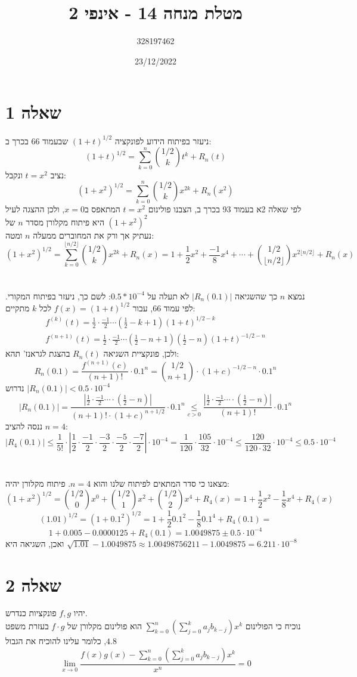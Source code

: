 \documentclass{article}
\title{מטלת מנחה 14 - אינפי 2}
\author{328197462}
\date{23/12/2022}
\newcommand\underrel[2]{\mathrel{\mathop{#2}\limits_{#1}}}
\begin{document}
\long{}
\maketitle

\section*{שאלה 1}

ניעזר בפיתוח הידוע לפונקציה $(1+t)^{1/2}$
שבעמוד 66 בכרך ב:
\[
    (1+t)^{1/2} = \sum_{k=0}^n \binom{1/2}{k}t^k+R_n(t)
\]
נציב $t=x^2$ ונקבל:
\[
    (1+x^2)^{1/2} = \sum_{k=0}^n \binom{1/2}{k}x^{2k}+R_n(x^2)
\]
לפי שאלה 2א בעמוד 93 בכרך ב, הצבנו פולינום $t=x^2$ המתאפס ב$x=0$,
ולכן ההצגה לעיל היא פיתוח מקלורן מסדר $n$ של $(1+x^2)^2$\\
נעתיק אך ורק את המחוברים ממעלה $n$ ומטה:
\[
    (1+x^2)^{1/2} =
    \sum_{k=0}^{\lfloor n/2 \rfloor} \binom{1/2}{k}x^{2k} + R_n(x) = 1 + \frac{1}{2}x^2+\frac{-1}{8}x^4+\cdots + \binom{1/2}{\lfloor n/2 \rfloor}x^{2\lfloor n/2 \rfloor} + R_n(x)
\]
\\\\
נמצא $n$ כך שהשגיאה $|R_n(0.1)|$ לא תעלה על $0.5*10^{-4}$:
לשם כך, ניעזר בפיתוח המקורי. לפי עמוד 66, עבור $f(x)=(1+t)^{1/2}$ לכל $k$ מתקיים:
\[
    \begin{matrix}
        f^{(k)}(t)=\frac{1}{2}\cdot \frac{-1}{2} \cdots (\frac{1}{2}-k+1)(1+t)^{1/2-k} \\
        f^{(n+1)}(t)=\frac{1}{2}\cdot \frac{-1}{2} \cdots (\frac{1}{2}-n+1)(\frac{1}{2}-n)(1+t)^{-1/2-n}
    \end{matrix}
\]
ולכן, פונקציית השגיאה $R_n(t)$ בהצגת לגראנז' תהא:
\[
    R_n(0.1) = \frac{f^{(n+1)}(c)}{(n+1)!} \cdot 0.1^n=
    \binom{1/2}{n+1}\cdot (1+c)^{-1/2-n} \cdot 0.1^n
\]
נדרוש $|R_n(0.1)|<0.5\cdot 10^{-4}$
\[
    |R_n(0.1)| =
    \frac{|\frac{1}{2} \cdot \frac{-1}{2} \cdots \cdot (\frac{1}{2}-n)|}{(n+1)!\cdot (1+c)^{n+1/2}} \cdot 0.1^n \underrel{c>0}{\leq}
    \frac{|\frac{1}{2} \cdot \frac{-1}{2} \cdots \cdot (\frac{1}{2}-n)|}{(n+1)!} \cdot 0.1^n
\]
ננסה להציב $n=4$:
\[
    |R_4(0.1)|\leq \frac{1}{5!} \cdot |\frac{1}{2}\cdot \frac{-1}{2}\cdot \frac{-3}{2}\cdot \frac{-5}{2} \cdot \frac{-7}{2}| \cdot 10^{-4} =
    \frac{1}{120} \cdot \frac{105}{32} \cdot 10^{-4} \leq
    \frac{120}{120\cdot 32} \cdot 10^{-4} \leq 0.5 \cdot 10^{-4}
\]
\\\\
מצאנו כי סדר המתאים לפיתוח שלנו והוא $n=4$. פיתוח מקלורן יהיה:
\[
    (1+x^2)^{1/2} = \binom{1/2}{0}x^0+\binom{1/2}{1}x^2+\binom{1/2}{2}x^4 + R_4(x) =
    1+\frac{1}{2}x^2-\frac{1}{8}x^4+R_4(x)
\]
\[
    (1.01)^{1/2}=(1+0.1^2)^{1/2}=1+\frac{1}{2}0.1^2 - \frac{1}{8}0.1^4+R_4(0.1) =
\]
\[
    1 + 0.005 - 0.0000125 + R_4(0.1) = 1.0049875 \pm 0.5 \cdot 10^{-4}
\]
ואכן, השגיאה היא $\sqrt{1.01}-1.0049875\approx 1.00498756211 - 1.0049875 = 6.211\cdot 10^{-8}$

\section*{שאלה 2}

יהיו $f,g$ פונקציות כנדרש. \\
נוכיח כי הפולינום $\sum_{k=0}^{n}(\sum_{j=0}^ka_jb_{k-j})x^k$
הוא פולינום מקלורן של $f\cdot g$ בעזרת משפט $4.8$,
כלומר עלינו להוכיח את הגבול
\[
    \lim_{x\rightarrow 0} \frac{f(x)g(x)-\sum_{k=0}^{n}(\sum_{j=0}^ka_jb_{k-j})x^k}{x^n}=0
\]
\end{document}
